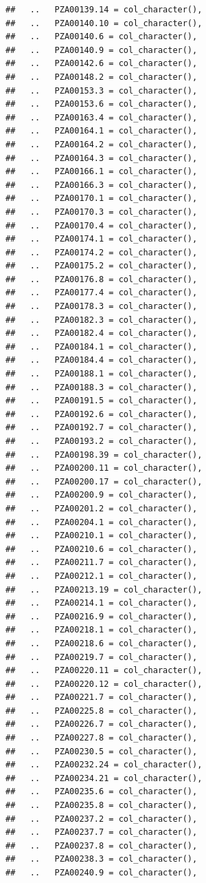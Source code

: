 \documentclass[
]{article}
\begin{document}
\begin{verbatim}
##   ..   PZA00139.14 = col_character(),
##   ..   PZA00140.10 = col_character(),
##   ..   PZA00140.6 = col_character(),
##   ..   PZA00140.9 = col_character(),
##   ..   PZA00142.6 = col_character(),
##   ..   PZA00148.2 = col_character(),
##   ..   PZA00153.3 = col_character(),
##   ..   PZA00153.6 = col_character(),
##   ..   PZA00163.4 = col_character(),
##   ..   PZA00164.1 = col_character(),
##   ..   PZA00164.2 = col_character(),
##   ..   PZA00164.3 = col_character(),
##   ..   PZA00166.1 = col_character(),
##   ..   PZA00166.3 = col_character(),
##   ..   PZA00170.1 = col_character(),
##   ..   PZA00170.3 = col_character(),
##   ..   PZA00170.4 = col_character(),
##   ..   PZA00174.1 = col_character(),
##   ..   PZA00174.2 = col_character(),
##   ..   PZA00175.2 = col_character(),
##   ..   PZA00176.8 = col_character(),
##   ..   PZA00177.4 = col_character(),
##   ..   PZA00178.3 = col_character(),
##   ..   PZA00182.3 = col_character(),
##   ..   PZA00182.4 = col_character(),
##   ..   PZA00184.1 = col_character(),
##   ..   PZA00184.4 = col_character(),
##   ..   PZA00188.1 = col_character(),
##   ..   PZA00188.3 = col_character(),
##   ..   PZA00191.5 = col_character(),
##   ..   PZA00192.6 = col_character(),
##   ..   PZA00192.7 = col_character(),
##   ..   PZA00193.2 = col_character(),
##   ..   PZA00198.39 = col_character(),
##   ..   PZA00200.11 = col_character(),
##   ..   PZA00200.17 = col_character(),
##   ..   PZA00200.9 = col_character(),
##   ..   PZA00201.2 = col_character(),
##   ..   PZA00204.1 = col_character(),
##   ..   PZA00210.1 = col_character(),
##   ..   PZA00210.6 = col_character(),
##   ..   PZA00211.7 = col_character(),
##   ..   PZA00212.1 = col_character(),
##   ..   PZA00213.19 = col_character(),
##   ..   PZA00214.1 = col_character(),
##   ..   PZA00216.9 = col_character(),
##   ..   PZA00218.1 = col_character(),
##   ..   PZA00218.6 = col_character(),
##   ..   PZA00219.7 = col_character(),
##   ..   PZA00220.11 = col_character(),
##   ..   PZA00220.12 = col_character(),
##   ..   PZA00221.7 = col_character(),
##   ..   PZA00225.8 = col_character(),
##   ..   PZA00226.7 = col_character(),
##   ..   PZA00227.8 = col_character(),
##   ..   PZA00230.5 = col_character(),
##   ..   PZA00232.24 = col_character(),
##   ..   PZA00234.21 = col_character(),
##   ..   PZA00235.6 = col_character(),
##   ..   PZA00235.8 = col_character(),
##   ..   PZA00237.2 = col_character(),
##   ..   PZA00237.7 = col_character(),
##   ..   PZA00237.8 = col_character(),
##   ..   PZA00238.3 = col_character(),
##   ..   PZA00240.9 = col_character(),

\end{verbatim}
\end{document}
